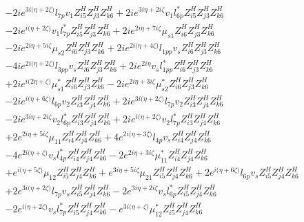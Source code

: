 \begin{align}
 &-2 i e^{3 i \Big(\eta +2 \zeta \Big)} l_{7p} v_1 Z_{{i 5}}^{H} Z_{{j 3}}^{H} Z_{{k 6}}^{H} +2 i e^{3 i \eta +2 i \zeta } v_1 l_{6p}^* Z_{{i 5}}^{H} Z_{{j 3}}^{H} Z_{{k 6}}^{H} \nonumber \\ 
 &-2 i e^{i \Big(\eta +2 \zeta \Big)} v_1 l_{7p}^* Z_{{i 5}}^{H} Z_{{j 3}}^{H} Z_{{k 6}}^{H} +2 i e^{2 i \eta +7 i \zeta } \mu_{s1} Z_{{i 6}}^{H} Z_{{j 3}}^{H} Z_{{k 6}}^{H} \nonumber \\ 
 &-2 i e^{2 i \eta +5 i \zeta } \mu_{s2} Z_{{i 6}}^{H} Z_{{j 3}}^{H} Z_{{k 6}}^{H} +2 i e^{2 i \Big(\eta +4 \zeta \Big)} l_{1pp} v_s Z_{{i 6}}^{H} Z_{{j 3}}^{H} Z_{{k 6}}^{H} \nonumber \\ 
 &-4 i e^{2 i \Big(\eta +2 \zeta \Big)} l_{3pp} v_s Z_{{i 6}}^{H} Z_{{j 3}}^{H} Z_{{k 6}}^{H} +2 i e^{2 i \eta } v_s l_{1pp}^* Z_{{i 6}}^{H} Z_{{j 3}}^{H} Z_{{k 6}}^{H} \nonumber \\ 
 &+2 i e^{i \Big(2 \eta +\zeta \Big)} \mu_{s1}^* Z_{{i 6}}^{H} Z_{{j 3}}^{H} Z_{{k 6}}^{H} -2 i e^{2 i \eta +3 i \zeta } \mu_{s2}^* Z_{{i 6}}^{H} Z_{{j 3}}^{H} Z_{{k 6}}^{H} \nonumber \\ 
 &-2 i e^{i \Big(\eta +6 \zeta \Big)} l_{6p} v_2 Z_{{i 3}}^{H} Z_{{j 4}}^{H} Z_{{k 6}}^{H} +2 i e^{3 i \Big(\eta +2 \zeta \Big)} l_{7p} v_2 Z_{{i 3}}^{H} Z_{{j 4}}^{H} Z_{{k 6}}^{H} \nonumber \\ 
 &-2 i e^{3 i \eta +2 i \zeta } v_2 l_{6p}^* Z_{{i 3}}^{H} Z_{{j 4}}^{H} Z_{{k 6}}^{H} +2 i e^{i \Big(\eta +2 \zeta \Big)} v_2 l_{7p}^* Z_{{i 3}}^{H} Z_{{j 4}}^{H} Z_{{k 6}}^{H} \nonumber \\ 
 &+2 e^{2 i \eta +5 i \zeta } \mu_{11} Z_{{i 4}}^{H} Z_{{j 4}}^{H} Z_{{k 6}}^{H} +4 e^{2 i \Big(\eta +3 \zeta \Big)} l_{4p} v_s Z_{{i 4}}^{H} Z_{{j 4}}^{H} Z_{{k 6}}^{H} \nonumber \\ 
 &-4 e^{2 i \Big(\eta +\zeta \Big)} v_s l_{4p}^* Z_{{i 4}}^{H} Z_{{j 4}}^{H} Z_{{k 6}}^{H} -2 e^{2 i \eta +3 i \zeta } \mu_{11}^* Z_{{i 4}}^{H} Z_{{j 4}}^{H} Z_{{k 6}}^{H} \nonumber \\ 
 &+e^{i \Big(\eta +5 \zeta \Big)} \mu_{12} Z_{{i 5}}^{H} Z_{{j 4}}^{H} Z_{{k 6}}^{H} +e^{3 i \eta +5 i \zeta } \mu_{21} Z_{{i 5}}^{H} Z_{{j 4}}^{H} Z_{{k 6}}^{H} +2 e^{i \Big(\eta +6 \zeta \Big)} l_{6p} v_s Z_{{i 5}}^{H} Z_{{j 4}}^{H} Z_{{k 6}}^{H} \nonumber \\ 
 &+2 e^{3 i \Big(\eta +2 \zeta \Big)} l_{7p} v_s Z_{{i 5}}^{H} Z_{{j 4}}^{H} Z_{{k 6}}^{H} -2 e^{3 i \eta +2 i \zeta } v_s l_{6p}^* Z_{{i 5}}^{H} Z_{{j 4}}^{H} Z_{{k 6}}^{H} \nonumber \\ 
 &-2 e^{i \Big(\eta +2 \zeta \Big)} v_s l_{7p}^* Z_{{i 5}}^{H} Z_{{j 4}}^{H} Z_{{k 6}}^{H} - e^{3 i \Big(\eta +\zeta \Big)} \mu_{12}^* Z_{{i 5}}^{H} Z_{{j 4}}^{H} Z_{{k 6}}^{H} \nonumber \\ 

\end{align}
